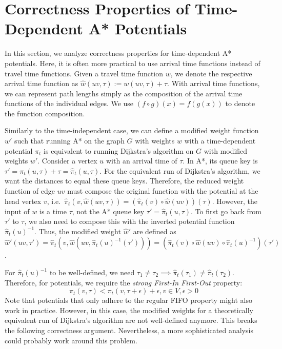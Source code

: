 \documentclass[a4paper,UKenglish,cleveref, autoref, thm-restate]{lipics-v2021}
\begin{document}
\section{Correctness Properties of Time-Dependent A* Potentials}\label{sec:appendix:correctness}

In this section, we analyze correctness properties for time-dependent A* potentials.
Here, it is often more practical to use arrival time functions instead of travel time functions.
Given a travel time function $w$, we denote the respective arrival time function as $\hat{w}(uv, \tau) := w(uv, \tau) + \tau$.
With arrival time functions, we can represent path lengths simply as the composition of the arrival time functions of the individual edges.
We use $(f \circ g)(x) = f(g(x))$ to denote the function composition.

Similarly to the time-independent case, we can define a modified weight function $w'$ such that running A* on the graph $G$ with weights $w$ with a time-dependent potential $\pi_t$ is equivalent to running Dijkstra's algorithm on $G$ with modified weights $w'$.
Consider a vertex $u$ with an arrival time of $\tau$.
In A*, its queue key is $\tau' = \pi_t(u, \tau) + \tau = \hat{\pi}_t(u, \tau)$.
For the equivalent run of Dijkstra's algorithm, we want the distances to equal these queue keys.
Therefore, the reduced weight function of edge $uv$ must compose the original function with the potential at the head vertex $v$, i.e.\ $\hat{\pi}_t(v, \hat{w}(uv, \tau)) = (\hat{\pi}_t(v) \circ \hat{w}(uv))(\tau)$.
However, the input of $w$ is a time $\tau$, not the A* queue key $\tau' = \hat{\pi}_t(u, \tau)$.
To first go back from $\tau'$ to $\tau$, we also need to compose this with the inverted potential function $\hat{\pi}_t(u)^{-1}$.
Thus, the modified weight $\hat{w}'$ are defined as $\hat{w}'(uv, \tau') = \hat{\pi}_t(v, \hat{w}(uv, \hat{\pi}_t(u)^{-1}(\tau'))) = (\hat{\pi}_t(v) \circ \hat{w}(uv) \circ \hat{\pi}_t(u)^{-1})(\tau')$.

For $\hat{\pi}_t(u)^{-1}$ to be well-defined, we need $\tau_1 \neq \tau_2 \implies \hat{\pi}_t(\tau_1) \neq \hat{\pi}_t(\tau_2)$.
Therefore, for potentials, we require the \emph{strong First-In First-Out} property:
\[
\pi_t(v, \tau) < \pi_t(v, \tau + \epsilon) + \epsilon, v \in V, \epsilon > 0
\]
Note that potentials that only adhere to the regular FIFO property might also work in practice.
However, in this case, the modified weights for a theoretically equivalent run of Dijkstra's algorithm are not well-defined anymore.
This breaks the following correctness argument.
Nevertheless, a more sophisticated analysis could probably work around this problem.
\end{document}
